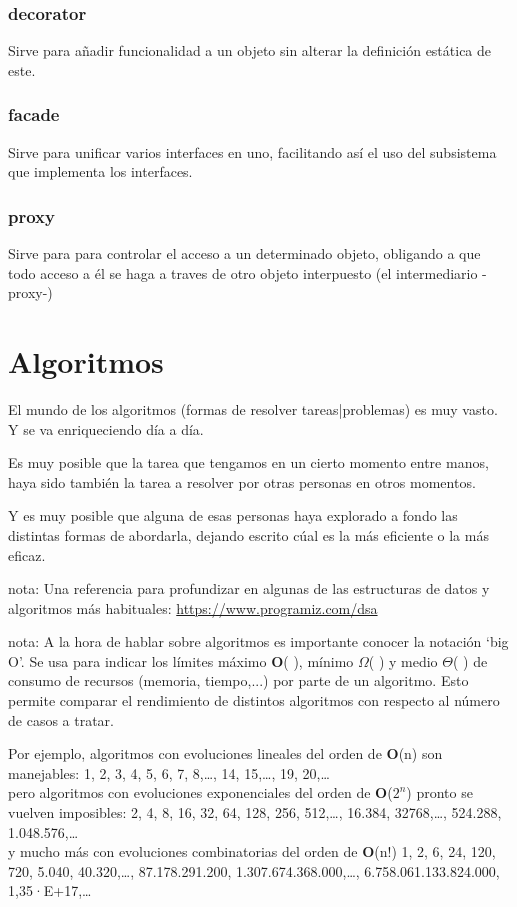 \documentclass[spanish,12pt,a4paper,final,oneside]{book}
\begin{document}
\subsubsection{decorator}
Sirve para añadir funcionalidad a un objeto sin alterar la definición estática de este.
\subsubsection{facade}
Sirve para unificar varios interfaces en uno, facilitando así el uso del subsistema que implementa los interfaces.
\subsubsection{proxy}
Sirve para para controlar el acceso a un determinado objeto, obligando a que todo acceso a él se haga a traves de otro objeto interpuesto (el intermediario -proxy-)




\section{Algoritmos}

El mundo de los algoritmos (formas de resolver tareas|problemas) es muy vasto. Y se va enriqueciendo día a día.

Es muy posible que la tarea que tengamos en un cierto momento entre manos, haya sido también la tarea a resolver por otras personas en otros momentos.

Y es muy posible que alguna de esas personas haya explorado a fondo las distintas formas de abordarla, dejando escrito cúal es la más eficiente o la más eficaz.

\vspace{0.5cm}
nota: Una referencia para profundizar en algunas de las estructuras de datos y algoritmos más habituales: \url{https://www.programiz.com/dsa}

\vspace{0.5cm}
nota: A la hora de hablar sobre algoritmos es importante conocer la notación `big O'. Se usa para indicar los límites máximo \textbf{O}( ), mínimo \textbf{$\Omega$}( ) y medio \textbf{$\Theta$}( ) de consumo de recursos (memoria, tiempo,...) por parte de un algoritmo. Esto permite comparar el rendimiento de distintos algoritmos con respecto al número de casos a tratar.

Por ejemplo, algoritmos con evoluciones lineales del orden de \textbf{O}(n) son manejables: 1, 2, 3, 4, 5, 6, 7, 8,\ldots, 14, 15,\ldots, 19, 20,\ldots 
\\pero algoritmos con evoluciones exponenciales del orden de \textbf{O}($2^n$) pronto se vuelven  imposibles: 2, 4, 8, 16, 32, 64, 128, 256, 512,\ldots, 16.384, 32768,\ldots, 524.288, 1.048.576,\ldots 
\\y mucho más con evoluciones combinatorias del orden de \textbf{O}(n!)  1, 2, 6, 24, 120, 720, 5.040, 40.320,\ldots, 87.178.291.200, 1.307.674.368.000,\ldots, 6.758.061.133.824.000, 1,35·E+17,\ldots
\end{document}
